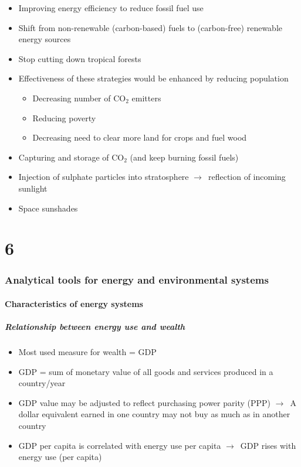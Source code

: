 \documentclass{article}
\begin{document}
\vspace*{-.4cm}
\begin{itemize}
    \item Improving energy efficiency to reduce fossil fuel use
    \item Shift from non-renewable (carbon-based) fuels to (carbon-free) renewable energy sources
    \item Stop cutting down tropical forests
    \item Effectiveness of these strategies would be enhanced by reducing population\\
    \begin{itemize}[label=$\to$]
        \item Decreasing number of CO$_2$ emitters
        \item Reducing poverty
        \item Decreasing need to clear more land for crops and fuel wood
    \end{itemize}
\end{itemize}

\vspace*{-.4cm}
\begin{itemize}
    \item Capturing and storage of CO$_2$ (and keep burning fossil fuels)
    \item Injection of sulphate particles into stratosphere $\to$\ reflection of incoming sunlight
    \item Space sunshades
\end{itemize}

\part{6}
\section{Analytical tools for energy and environmental systems}
\subsection{Characteristics of energy systems}
\subsubsection{Relationship between energy use and wealth}
\begin{itemize}
    \item Most used measure for wealth = GDP
    \item GDP = sum of monetary value of all goods and services produced in a country/year
    \item GDP value may be adjusted to reflect purchasing power parity (PPP) $\to$\ A dollar equivalent earned in one country may not buy as much as in another country
    \item GDP per capita is correlated with energy use per capita $\to$\ GDP rises with energy use (per capita)
\end{itemize}
\end{document}
